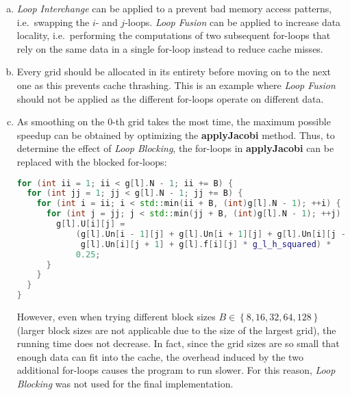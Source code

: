 \documentclass[11pt]{article}
\begin{document}
    \begin{enumerate}[a)]
        \item \textit{Loop Interchange} can be applied to a prevent bad
        memory access patterns, i.e.\ swapping the $i$- and $j$-loops.
        \textit{Loop Fusion} can be applied to increase data locality, i.e.\
        performing the computations of two subsequent for-loops that rely on
        the same data in a single for-loop instead to reduce cache misses.
        \item Every grid should be allocated in its entirety before moving
        on to the next one as this prevents cache thrashing.
        This is an example where \textit{Loop Fusion} should not be
        applied as the different for-loops operate on different data.
        \item As smoothing on the $0$-th grid takes the most time, the
        maximum possible speedup can be obtained by optimizing the
        \textbf{applyJacobi} method.
        Thus, to determine the effect of \textit{Loop Blocking}, the
        for-loops in \textbf{applyJacobi} can be replaced with the blocked
        for-loops:
\begin{lstlisting}[language=c++, basicstyle=\tiny]
for (int ii = 1; ii < g[l].N - 1; ii += B) {
  for (int jj = 1; jj < g[l].N - 1; jj += B) {
    for (int i = ii; i < std::min(ii + B, (int)g[l].N - 1); ++i) {
      for (int j = jj; j < std::min(jj + B, (int)g[l].N - 1); ++j) {
        g[l].U[i][j] =
            (g[l].Un[i - 1][j] + g[l].Un[i + 1][j] + g[l].Un[i][j - 1] +
             g[l].Un[i][j + 1] + g[l].f[i][j] * g_l_h_squared) *
            0.25;
      }
    }
  }
}
\end{lstlisting}
        However, even when trying different block sizes
        $B \in \left\{ 8, 16, 32, 64, 128 \right\}$ (larger block
        sizes are not applicable due to the size of the largest grid), the
        running time does not decrease.
        In fact, since the grid sizes are so small that enough data can fit
        into the cache, the overhead induced by the two additional for-loops
        causes the program to run slower.
        For this reason, \textit{Loop Blocking} was not used for the final
        implementation.
    \end{enumerate}
\end{document}
